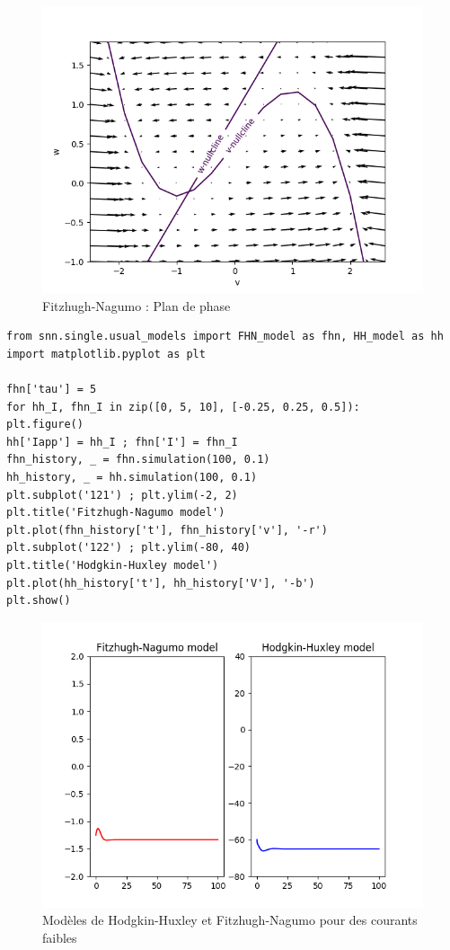 \documentclass[12pt]{scrartcl}
\begin{document}
\begin{figure}[!h]
\centering
\includegraphics[scale=0.7]{imgs/FNPDP.png}
\caption{Fitzhugh-Nagumo : Plan de phase}
\label{FNPDP}
\end{figure}

\clearpage
\begin{lstlisting}[caption = {Comparaison des comportements des modèles de Fitzhugh-Nagumo et Hodgkin-Huxley}]
from snn.single.usual_models import FHN_model as fhn, HH_model as hh
import matplotlib.pyplot as plt

fhn['tau'] = 5
for hh_I, fhn_I in zip([0, 5, 10], [-0.25, 0.25, 0.5]):
plt.figure()
hh['Iapp'] = hh_I ; fhn['I'] = fhn_I
fhn_history, _ = fhn.simulation(100, 0.1)
hh_history, _ = hh.simulation(100, 0.1)
plt.subplot('121') ; plt.ylim(-2, 2) 
plt.title('Fitzhugh-Nagumo model')
plt.plot(fhn_history['t'], fhn_history['v'], '-r')
plt.subplot('122') ; plt.ylim(-80, 40) 
plt.title('Hodgkin-Huxley model')
plt.plot(hh_history['t'], hh_history['V'], '-b') 
plt.show()
\end{lstlisting}

\begin{figure}[!h]
\centering
\includegraphics[scale=0.5]{imgs/hhfhnfaible.png}
\caption{Modèles de Hodgkin-Huxley et Fitzhugh-Nagumo pour des courants faibles}
\label{hhfhnfaible}
\end{figure}
\end{document}
